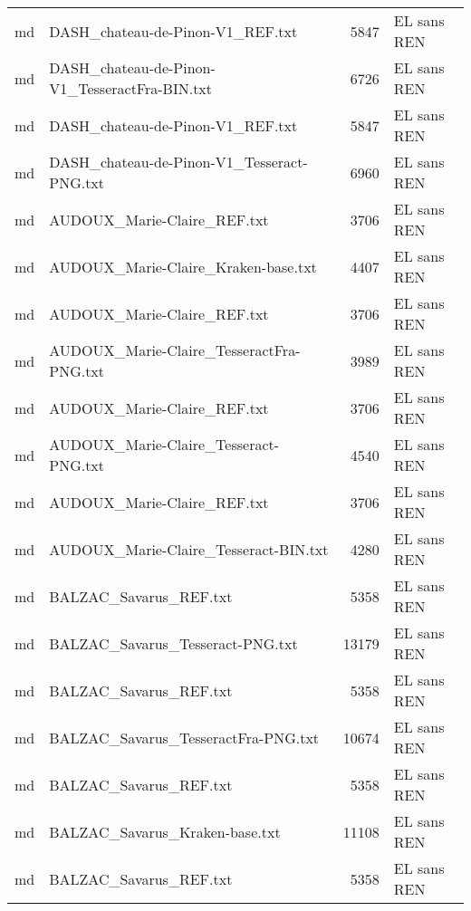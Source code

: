 \begin{tabular}{llrl}
    md &                   DASH\_chateau-de-Pinon-V1\_REF.txt &                  5847 & EL sans REN \\
    md &      DASH\_chateau-de-Pinon-V1\_TesseractFra-BIN.txt &                  6726 & EL sans REN \\
    md &                   DASH\_chateau-de-Pinon-V1\_REF.txt &                  5847 & EL sans REN \\
    md &         DASH\_chateau-de-Pinon-V1\_Tesseract-PNG.txt &                  6960 & EL sans REN \\
    md &                        AUDOUX\_Marie-Claire\_REF.txt &                  3706 & EL sans REN \\
    md &                AUDOUX\_Marie-Claire\_Kraken-base.txt &                  4407 & EL sans REN \\
    md &                        AUDOUX\_Marie-Claire\_REF.txt &                  3706 & EL sans REN \\
    md &           AUDOUX\_Marie-Claire\_TesseractFra-PNG.txt &                  3989 & EL sans REN \\
    md &                        AUDOUX\_Marie-Claire\_REF.txt &                  3706 & EL sans REN \\
    md &              AUDOUX\_Marie-Claire\_Tesseract-PNG.txt &                  4540 & EL sans REN \\
    md &                        AUDOUX\_Marie-Claire\_REF.txt &                  3706 & EL sans REN \\
    md &              AUDOUX\_Marie-Claire\_Tesseract-BIN.txt &                  4280 & EL sans REN \\
    md &                             BALZAC\_Savarus\_REF.txt &                  5358 & EL sans REN \\
    md &                   BALZAC\_Savarus\_Tesseract-PNG.txt &                 13179 & EL sans REN \\
    md &                             BALZAC\_Savarus\_REF.txt &                  5358 & EL sans REN \\
    md &                BALZAC\_Savarus\_TesseractFra-PNG.txt &                 10674 & EL sans REN \\
    md &                             BALZAC\_Savarus\_REF.txt &                  5358 & EL sans REN \\
    md &                     BALZAC\_Savarus\_Kraken-base.txt &                 11108 & EL sans REN \\
    md &                             BALZAC\_Savarus\_REF.txt &                  5358 & EL sans REN \\

\end{tabular}
